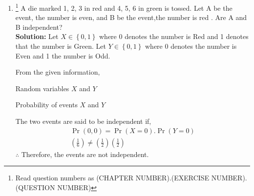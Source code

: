 \documentclass{article}
\providecommand{\cbrak}[1]{\ensuremath{\left\{#1\right\}}}
\newcommand{\solution}{\noindent \textbf{Solution: }}
\providecommand{\pr}[1]{\ensuremath{\Pr\left(#1\right)}}
\numberwithin{table}{enumi}
\begin{document}
\begin{enumerate}[label=13.\arabic{enumi}.\arabic{enumii}]
\setcounter{enumi}{1}
\setcounter{enumii}{5}
\item \footnote{Read question numbers as (CHAPTER NUMBER).(EXERCISE NUMBER).(QUESTION NUMBER)}
A die marked 1, 2, 3 in red and 4, 5, 6 in green is tossed. Let A be the event,
the number is even, and B be the event,the number is red . Are A and B
independent?\\
\solution
Let $X \in \cbrak{0,1}$ where 0 denotes the number is Red and 1 denotes that the number is Green. Let $Y \in \cbrak{0,1}$ where 0 denotes the number is Even and 1 the number is Odd.

From the given information,
\begin{table}[h]
\centering

	 \caption{Random variables $X$ and $Y$}
	 \label{table:1}   
\end{table}

\begin{table}[h]
\centering

	 \caption{Probability of events $X$ and $Y$}
	 \label{table:2}   
\end{table}
The two events are said to be independent if,
\begin{align}
\pr{0,0} = \pr{X=0}.\pr{Y=0}\\
\left(\frac{1}{6}\right) \neq \left(\frac{1}{2}\right)\left(\frac{1}{2}\right)
\end{align}
$\therefore$ Therefore, the events are not independent.
\end{enumerate}
\end{document}
